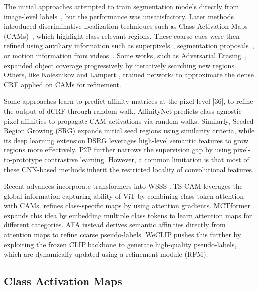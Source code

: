 The initial approaches attempted to train segmentation models directly from image-level labels~\cite{dcnn}, but the performance was unsatisfactory. Later methods introduced discriminative localization techniques such as Class Activation Maps (CAMs)~\cite{cam}, which highlight class-relevant regions. These coarse cues were then refined using auxiliary information such as superpixels~\cite{imagelevelpixel}, segmentation proposals~\cite{imagelevelpixel}, or motion information from videos~\cite{wsss_motion_cues}. Some works, such as Adversarial Erasing~\cite{adversarial_erasing}, expanded object coverage progressively by iteratively searching new regions. Others, like Kolesnikov and Lampert \cite{kolesnikov2016}, trained networks to approximate the dense CRF \cite{krähenbühl} applied on CAMs for refinement.

Some approaches learn to predict affinity matrices at the pixel level [36], to refine the output of dCRF through random walk. AffinityNet \cite{wsss_affinitynet} predicts class-agnostic pixel affinities to propagate CAM activations via random walks. Similarly, Seeded Region Growing (SRG) \cite{srg} expands initial seed regions using similarity criteria, while its deep learning extension DSRG \cite{wsss_dsrg_deep_seeded_region_growing} leverages high-level semantic features to grow regions more effectively. P2P \cite{pixel_to_prototype} further narrows the supervision gap by using pixel-to-prototype contrastive learning. However, a common limitation is that most of these CNN-based methods inherit the restricted locality of convolutional features.

Recent advances incorporate transformers into WSSS \cite{camtokens, getam}. TS-CAM \cite{camtokens} leverages the global information capturing ability of ViT by combining class-token attention with CAMs. \cite{getam} refines class-specific maps by using attention gradients. MCTformer \cite{wsss_MCTformer} expands this idea by embedding multiple class tokens to learn attention maps for different categories. AFA \cite{wsss_afa_affinity_from_attention} instead derives semantic affinities directly from attention maps to refine coarse pseudo-labels. WeCLIP \cite{wsss_frozen_clip} pushes this further by exploiting the frozen CLIP backbone to generate high-quality pseudo-labels, which are dynamically updated using a refinement module (RFM).

\subsection{Class Activation Maps}
\label{subsec:class-activation-maps}

